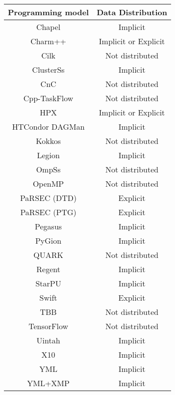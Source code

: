 \begin{tabular}{cc}
\hline
Programming model & Data Distribution \\
\hline
Chapel & Implicit\\
Charm++ & Implicit or Explicit\\
Cilk & Not distributed\\
ClusterSs & Implicit\\
CnC & Not distributed\\
Cpp-TaskFlow & Not distributed\\
HPX & Implicit or Explicit\\
HTCondor DAGMan & Implicit\\
Kokkos & Not distributed\\
Legion & Implicit\\
OmpSs & Not distributed\\
OpenMP & Not distributed\\
PaRSEC (DTD) & Explicit\\
PaRSEC (PTG) & Explicit\\
Pegasus & Implicit\\
PyGion & Implicit\\
QUARK & Not distributed\\
Regent & Implicit\\
StarPU & Implicit\\
Swift & Explicit\\
TBB & Not distributed\\
TensorFlow & Not distributed\\
Uintah & Implicit\\
X10 & Implicit\\
YML & Implicit\\
YML+XMP & Implicit\\
\hline
\end{tabular}
